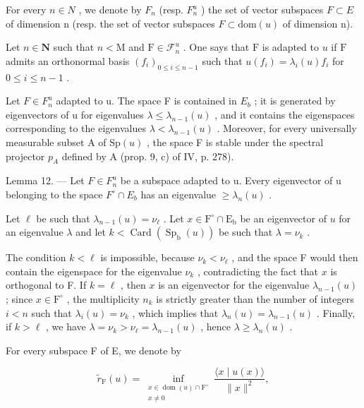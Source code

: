 For every \(n \in N\) , we denote by \(F_{n}\) (resp. \(F_{n}^{u}\) ) the set of vector subspaces \(F \subset E\) of dimension n (resp. the set of vector subspaces \(F \subset \text{dom}(u)\) of dimension n).

Let \(n \in \mathbf{N}\) such that \(n < \mathrm{M}\) and \(\mathrm{F} \in \mathcal{F}_n^u\) . One says that \(\mathrm{F}\) is adapted to \(u\) if \(\mathrm{F}\) admits an orthonormal basis \((f_i)_{0 \leqslant i \leqslant n-1}\) such that \(u(f_i) = \lambda_i(u)f_i\) for \(0 \leqslant i \leqslant n-1\) .

Let \(F \in F_{n}^{u}\) adapted to u. The space F is contained in \(E_{b}\) ; it is generated by eigenvectors of u for eigenvalues \(\lambda \leqslant \lambda_{n-1}(u)\) , and it contains the eigenspaces corresponding to the eigenvalues \(\lambda < \lambda_{n-1}(u)\) . Moreover, for every universally measurable subset A of \(\mathrm{Sp}(u)\) , the space F is stable under the spectral projector \(p_{A}\) defined by A (prop. 9, c) of IV, p. 278).

Lemma 12. --- Let \(F \in F_{n}^{u}\) be a subspace adapted to u. Every eigenvector of u belonging to the space \(F^{\circ} \cap E_{b}\) has an eigenvalue \(\geqslant \lambda_{n}(u)\) .

Let \(\ell\) be such that \(\lambda_{n-1}(u) = \nu_{\ell}\) . Let \(x \in \mathrm{F}^{\circ} \cap \mathrm{E}_{\mathrm{b}}\) be an eigenvector of \(u\) for an eigenvalue \(\lambda\) and let \(k < \operatorname{Card}(\operatorname{Sp}_{\mathrm{b}}(u))\) be such that \(\lambda = \nu_{k}\) .

The condition \(k < \ell\) is impossible, because \(\nu_k < \nu_\ell\) , and the space F would then contain the eigenspace for the eigenvalue \(\nu_k\) , contradicting the fact that \(x\) is orthogonal to F. If \(k = \ell\) , then \(x\) is an eigenvector for the eigenvalue \(\lambda_{n-1}(u)\) ; since \(x \in \mathrm{F}^\circ\) , the multiplicity \(n_k\) is strictly greater than the number of integers \(i < n\) such that \(\lambda_i(u) = \nu_k\) , which implies that \(\lambda_n(u) = \lambda_{n-1}(u)\) . Finally, if \(k > \ell\) , we have \(\lambda = \nu_k > \nu_\ell = \lambda_{n-1}(u)\) , hence \(\lambda \geqslant \lambda_n(u)\) .

For every subspace F of E, we denote by

\[
\widetilde{r}_{\mathrm{F}}(u) = \inf_{\substack{x\in \operatorname{dom}(u)\cap \mathrm{F}^{\circ}\\ x\neq 0}}\frac{\langle x\mid u(x)\rangle}{\|x\|^{2}},
\]

